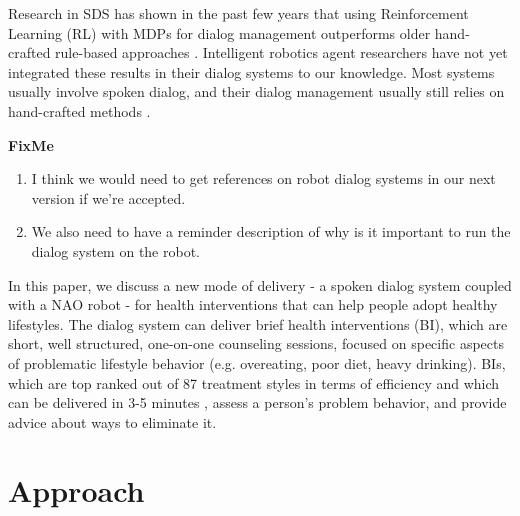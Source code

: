 \documentclass[letterpaper]{article}
\begin{document}
Research in SDS has shown in the past few years that using Reinforcement Learning (RL) with MDPs for dialog management outperforms older hand-crafted rule-based approaches \cite{frampton2009,young2013pomdp}. Intelligent robotics agent researchers have not yet integrated these results in their dialog systems to our knowledge. Most systems usually involve spoken dialog, and their dialog management usually still relies on hand-crafted methods \cite{morbiniFlores2012,Bickmore2010}. 

{\color{red}
\textbf{FixMe}
\begin{enumerate}
 \item I think we would need to get references on robot dialog systems in our next version 
if we're accepted.
 \item We also need to have a reminder description of why is it important to run the dialog system 
on the robot.  
\end{enumerate}
}

In this paper, we discuss a new mode of delivery - a spoken dialog system coupled with a NAO robot - for health interventions that can help people adopt healthy lifestyles.  The dialog system can deliver brief health interventions (BI), which are short, well structured, one-on-one counseling sessions, focused on specific aspects of problematic lifestyle behavior (e.g. overeating, poor diet, heavy drinking). BIs, which are top ranked out of 87 treatment styles in terms of efficiency \cite{miller2002mesa} and which can be delivered in 3-5 minutes \cite{Moyer2002}, assess a person's problem behavior, and provide advice about ways to eliminate it. 


\section*{Approach}
\end{document}
